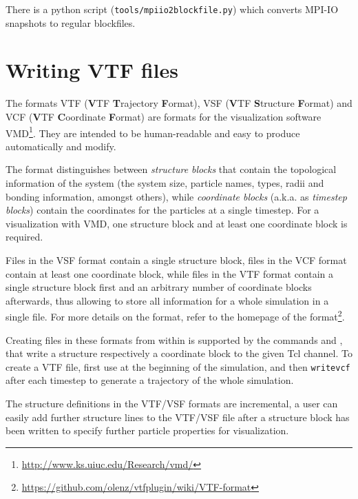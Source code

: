 There is a python script (\texttt{tools/mpiio2blockfile.py}) which
converts MPI-IO snapshots to regular \es blockfiles.


\section{Writing VTF files}
\label{sec:vtf}

The formats VTF (\textbf{V}TF \textbf{T}rajectory \textbf{F}ormat),
VSF (\textbf{V}TF \textbf{S}tructure \textbf{F}ormat) and VCF
(\textbf{V}TF \textbf{C}oordinate \textbf{F}ormat) are formats for the
visualization software
VMD\cite{humphrey96a}\footnote{\url{http://www.ks.uiuc.edu/Research/vmd/}}. They
are intended to be human-readable and easy to produce automatically
and modify.

The format distinguishes between \emph{structure blocks} that contain
the topological information of the system (\ie the system size,
particle names, types, radii and bonding information, amongst others),
while \emph{coordinate blocks} (a.k.a. as \emph{timestep blocks})
contain the coordinates for the particles at a single timestep.  For a
visualization with VMD, one structure block and at least one
coordinate block is required.

Files in the VSF format contain a single structure block, files in the
VCF format contain at least one coordinate block, while files in the
VTF format contain a single structure block first and an arbitrary
number of coordinate blocks afterwards, thus allowing to store all
information for a whole simulation in a single file. For more details
on the format, refer to the homepage of the
format\footnote{\url{https://github.com/olenz/vtfplugin/wiki/VTF-format}}.

Creating files in these formats from within \es is supported by the
commands  and , that write a structure
respectively a coordinate block to the given Tcl channel. To create a
VTF file, first use  at the beginning of the simulation,
and then \texttt{writevcf} after each timestep to generate a
trajectory of the whole simulation.

The structure definitions in the VTF/VSF formats are incremental, \ie
a user can easily add further structure lines to the VTF/VSF file
after a structure block has been written to specify further particle
properties for visualization.


